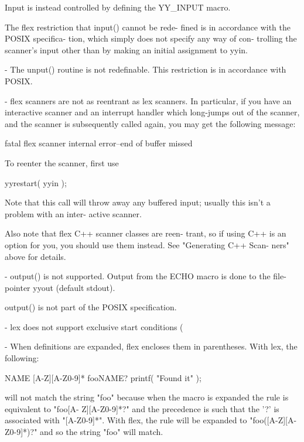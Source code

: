 \documentclass[12pt,spanish,twocolumn,lettersize]{article}
\begin{document}
{	      Input  is	 instead  controlled  by   defining   the
	      YY_INPUT macro.

	      The  flex	 restriction that input() cannot be rede-
	      fined is in accordance with  the	POSIX  specifica-
	      tion, which simply does not specify any way of con-
	      trolling the scanner's input other than  by  making
	      an initial assignment to yyin.

       -      The  unput()  routine  is	 not  redefinable.   This
	      restriction is in accordance with POSIX.

       -      flex scanners are not as reentrant as lex scanners.
	      In  particular,  if you have an interactive scanner
	      and an interrupt handler which  long-jumps  out  of
	      the scanner, and the scanner is subsequently called
	      again, you may get the following message:

		  fatal flex scanner internal error--end of buffer missed

	      To reenter the scanner, first use

		  yyrestart( yyin );

	      Note that this call will throw  away  any	 buffered
	      input;  usually this isn't a problem with an inter-
	      active scanner.

	      Also note that flex C++ scanner classes  are  reen-
	      trant,  so  if  using C++ is an option for you, you
	      should use them instead.	See "Generating C++ Scan-
	      ners" above for details.

       -      output()	is  not	 supported.  Output from the ECHO
	      macro is done to the  file-pointer  yyout	 (default
	      stdout).

	      output() is not part of the POSIX specification.

       -      lex  does	 not  support  exclusive start conditions
	      (%

       -      When definitions are expanded, flex  encloses  them
	      in parentheses.  With lex, the following:

		  NAME	  [A-Z][A-Z0-9]*
		  foo{NAME}?	  printf( "Found it\n" );

	      will  not	 match	the string "foo" because when the
	      macro is expanded the rule is equivalent to "foo[A-
	      Z][A-Z0-9]*?"   and the precedence is such that the
	      '?' is associated with "[A-Z0-9]*".  With flex, the
	      rule will be expanded to "foo([A-Z][A-Z0-9]*)?" and
	      so the string "foo" will match.

}
\end{document}
